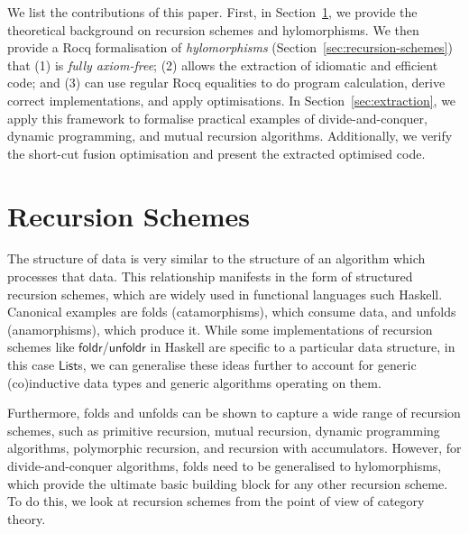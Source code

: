 \documentclass[a4paper,UKenglish,cleveref, autoref, thm-restate]{lipics-v2021}
\newcommand{\operator}[1]{\textsf{#1}}
\begin{document}
We list the contributions of this paper. First, in
Section~\ref{sec:category-theory}, we provide the theoretical background on
recursion schemes and hylomorphisms. We then provide a Rocq formalisation of
\emph{hylomorphisms} (Section~\ref{sec:recursion-schemes}) that (1) is
\emph{fully axiom-free}; (2) allows the extraction of idiomatic and efficient
code; and (3) can use regular Rocq equalities to do program calculation, derive
correct implementations, and apply optimisations. In
Section~\ref{sec:extraction}, we apply this framework to formalise practical
examples of divide-and-conquer, dynamic programming, and mutual recursion
algorithms. Additionally, we verify the short-cut fusion optimisation and
present the extracted optimised code.

\section{Recursion Schemes}\label{sec:category-theory}
The structure of data is very similar to the structure of an algorithm which
processes that data. This relationship manifests in the form of structured
recursion schemes, which are widely used in functional languages such Haskell.
Canonical examples are folds (catamorphisms), which consume data, and unfolds
(anamorphisms), which produce it. While some implementations of recursion
schemes like $\operator{foldr}$/$\operator{unfoldr}$ in Haskell are specific to
a particular data structure, in this case $\operator{List}$s, we can generalise
these ideas further to account for generic (co)inductive data types and generic
algorithms operating on them.

Furthermore, folds and unfolds can be shown to capture a wide range of recursion
schemes, such as primitive recursion, mutual recursion, dynamic programming
algorithms, polymorphic recursion, and recursion with accumulators. However, for
divide-and-conquer algorithms, folds need to be generalised to hylomorphisms,
which provide the ultimate basic building block for any other recursion scheme.
To do this, we look at recursion schemes from the point of view of category
theory.
\end{document}
